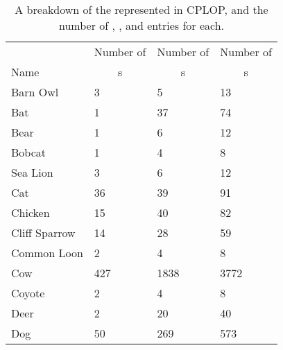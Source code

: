\begin{table}[t]
\centering
\caption{A breakdown of the \spec{} represented in CPLOP, and the number of \host{}, \isol{}, and \pyro{} entries for each.}
\label{tab:breakdown}
\begin{tabular}{|l|l|l|l|}
\hline
                      & \multicolumn{1}{c|}{Number of} & \multicolumn{1}{c|}{Number of} & \multicolumn{1}{c|}{Number of} \\
\Spec{} Name          & \multicolumn{1}{c|}{\host{}s}  & \multicolumn{1}{c|}{\isol{}s}  & \multicolumn{1}{c|}{\pyro{}s}  \\ \hline
Barn Owl              & 3                              & 5                              & 13                             \\
Bat                   & 1                              & 37                             & 74                             \\
Bear                  & 1                              & 6                              & 12                             \\
Bobcat                & 1                              & 4                              & 8                              \\
Sea Lion              & 3                              & 6                              & 12                             \\
Cat                   & 36                             & 39                             & 91                             \\
Chicken               & 15                             & 40                             & 82                             \\
Cliff Sparrow         & 14                             & 28                             & 59                             \\
Common Loon           & 2                              & 4                              & 8                              \\
Cow                   & 427                            & 1838                           & 3772                           \\
Coyote                & 2                              & 4                              & 8                              \\
Deer                  & 2                              & 20                             & 40                             \\
Dog                   & 50                             & 269                            & 573                            \\

\end{tabular}
\end{table}
